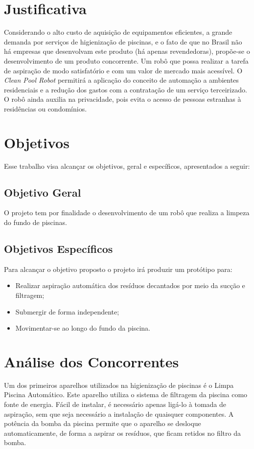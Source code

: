 \section{Justificativa}
Considerando o alto custo de aquisição de equipamentos eficientes, a grande 
demanda por serviços de higienização de piscinas, e o fato de que no Brasil não
há empresas que desenvolvam este produto (há apenas revendedoras), propõe-se o 
desenvolvimento de um produto concorrente. Um robô  que possa realizar a tarefa
de aspiração de  modo satisfatório e com um valor de mercado mais acessível. O 
\textit{Clean Pool Robot} permitirá a aplicação do conceito de automação a 
ambientes residenciais e a redução dos gastos com a contratação de um serviço 
terceirizado. O robô ainda auxilia na privacidade, pois evita o acesso de 
pessoas estranhas à residências ou condomínios. 

\section{Objetivos}
Esse trabalho visa alcançar os objetivos, geral e específicos, apresentados a 
seguir:

\subsection{Objetivo Geral}
O projeto tem por finalidade o desenvolvimento de um robô que realiza a limpeza
do fundo de piscinas.

\subsection{Objetivos Específicos}
Para alcançar o objetivo proposto o projeto irá produzir um protótipo para:
\begin{itemize}
  \item Realizar aspiração automática dos resíduos decantados por meio da sucção e filtragem;
  \item Submergir de forma independente;
  \item Movimentar-se ao longo do fundo da piscina.
 
\end{itemize}

\section{Análise dos Concorrentes}
Um dos primeiros aparelhos utilizados na higienização de piscinas é o Limpa 
Piscina Automático. Este aparelho utiliza o sistema de filtragem da piscina 
como fonte de energia. Fácil de instalar, é necessário apenas ligá-lo à tomada
de aspiração, sem que seja necessário a instalação de quaisquer componentes. 
A potência da bomba da piscina permite que o aparelho se desloque 
automaticamente, de forma a aspirar os resíduos, que ficam retidos no filtro 
da bomba.


